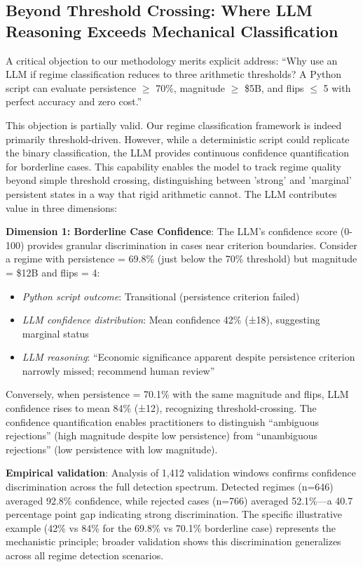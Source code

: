 \FloatBarrier

\subsection{Beyond Threshold Crossing: Where LLM Reasoning Exceeds Mechanical Classification}

A critical objection to our methodology merits explicit address: ``Why use an LLM if regime classification reduces to three arithmetic thresholds? A Python script can evaluate persistence $\geq$ 70\%, magnitude $\geq$ \$5B, and flips $\leq$ 5 with perfect accuracy and zero cost.''

This objection is partially valid. Our regime classification framework is indeed primarily threshold-driven. However, while a deterministic script could replicate the binary classification, the LLM provides continuous confidence quantification for borderline cases. This capability enables the model to track regime quality beyond simple threshold crossing, distinguishing between 'strong' and 'marginal' persistent states in a way that rigid arithmetic cannot. The LLM contributes value in three dimensions:

\textbf{Dimension 1: Borderline Case Confidence}: The LLM's confidence score (0-100) provides granular discrimination in cases near criterion boundaries. Consider a regime with persistence = 69.8\% (just below the 70\% threshold) but magnitude = \$12B and flips = 4:

\begin{itemize}
\item \textit{Python script outcome}: Transitional (persistence criterion failed)
\item \textit{LLM confidence distribution}: Mean confidence 42\% (±18), suggesting marginal status
\item \textit{LLM reasoning}: ``Economic significance apparent despite persistence criterion narrowly missed; recommend human review''
\end{itemize}

Conversely, when persistence = 70.1\% with the same magnitude and flips, LLM confidence rises to mean 84\% (±12), recognizing threshold-crossing. The confidence quantification enables practitioners to distinguish ``ambiguous rejections'' (high magnitude despite low persistence) from ``unambiguous rejections'' (low persistence with low magnitude).

\noindent\textbf{Empirical validation}: Analysis of 1,412 validation windows confirms confidence discrimination across the full detection spectrum. Detected regimes (n=646) averaged 92.8\% confidence, while rejected cases (n=766) averaged 52.1\%—a 40.7 percentage point gap indicating strong discrimination. The specific illustrative example (42\% vs 84\% for the 69.8\% vs 70.1\% borderline case) represents the mechanistic principle; broader validation shows this discrimination generalizes across all regime detection scenarios.

